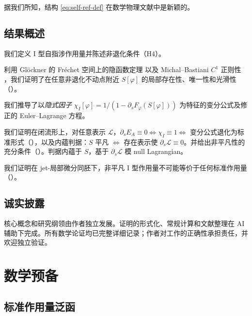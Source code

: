 \documentclass[12pt,a4paper]{article}
\theoremstyle{definition}
\newcommand{\mL}{\mathcal{L}}
\begin{document}
据我们所知，结构 \eqref{eq:self-ref-def} 在数学物理文献中是新颖的。

\subsection{结果概述}

\begin{description}[leftmargin=*]
\item[定义（\Cref{sec:def}）] 我们定义 I 型自指涉作用量并陈述非退化条件（H4）。
\item[存在性（\Cref{sec:existence}）] 利用 Gl\"ockner 的 Fr\'echet 空间上的隐函数定理 \cite{Glockner2006} 以及 Michal--Bastiani $C^1$ 正则性 \cite{Hamilton1982}，我们证明了在任意非退化不动点附近 $S[\varphi]$ 的局部存在性、唯一性和光滑性（）。
\item[变分原理（\Cref{sec:variational}）] 我们推导了以\emph{隐式因子} $\chi_I[\varphi] = 1/(1 - \partial_s F_\varphi(S[\varphi]))$ 为特征的变分公式及修正的 Euler--Lagrange 方程。
\item[非平凡性（\Cref{sec:nontriv}）] 我们证明在闭流形上，对任意表示 $\mL$，$\partial_s E_A \equiv 0 \iff \chi_I \equiv 1 \iff$ 变分公式退化为标准形式（），以及内蕴判据：$S$ 平凡 $\iff$ 存在表示使 $\partial_s \mL \equiv 0$。并给出非平凡性的充分条件（）。判据内蕴于 $S$，基于 $\partial_s\mathcal{L}$ 模 null Lagrangian。
\item[范畴论非等价性（\Cref{sec:cat}）] 我们证明在 jet-局部微分同胚下，非平凡 I 型作用量不可能等价于任何标准作用量（）。
\end{description}

\subsection{诚实披露}
\label{sec:disclosure}

核心概念和研究纲领由作者独立发展。证明的形式化、常规计算和文献整理在 AI 辅助下完成。所有数学论证均已完整详细记录；作者对工作的正确性承担责任，并欢迎独立验证。

\section{数学预备}
\label{sec:prelim}

\subsection{标准作用量泛函}
\end{document}

